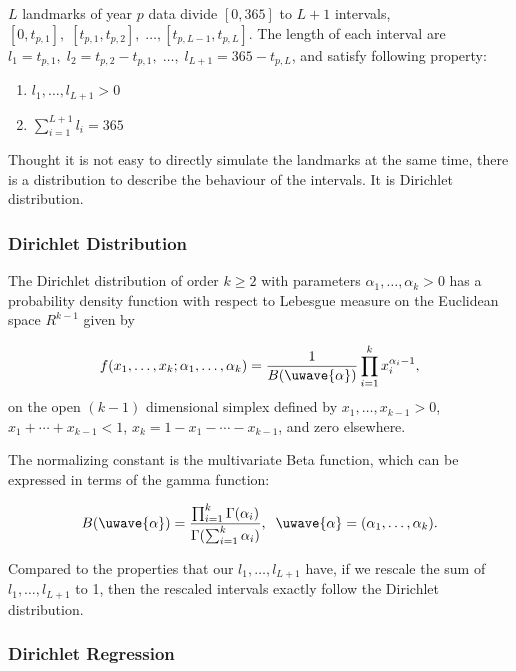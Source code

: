 \documentclass{article}
\begin{document}
$L$ landmarks of year $p$ data divide $[0,365]$ to $L+1$ intervals, $[0,t_{p,1}],\;[t_{p,1},t_{p,2}],\;\dots,[t_{p,L-1},t_{p,L}]$.
The length of each interval are $l_1 = t_{p,1},\;l_2=t_{p,2}-t_{p,1},\;\dots,\;l_{L+1}=365-t_{p,L}$, and satisfy following property:

\begin{enumerate}
\item $l_1,\dots,l_{L+1}>0$
\item $\sum_{i=1}^{L+1}l_i = 365$
\end{enumerate}

Thought it is not easy to directly simulate the landmarks at the same time, there is a distribution to describe the behaviour of the intervals. It is Dirichlet distribution.  

\subsubsection{Dirichlet Distribution}

The Dirichlet distribution of order $k\ge2$ with parameters $\alpha_1,\dots,\alpha_k>0$ has a probability density function with respect to Lebesgue measure on the Euclidean space $R^{k-1}$ given by 

\begin{equation}
f(x_1,\dots,x_k;\alpha_1,\dots,\alpha_k) = \frac{1}{B(\uwave{\alpha})}\prod_{i=1}^kx_i^{\alpha_i-1},
\end{equation}
on the open $(k-1)$ dimensional simplex defined by  $x_1,\dots,x_{k-1}>0$, $x_1+\cdots+x_{k-1}<1$,  $x_k = 1- x_1-\cdots-x_{k-1}$, and zero elsewhere.

The normalizing constant is the multivariate Beta function, which can be expressed in terms of the gamma function:

\begin{equation}
B(\uwave{\alpha}) = \frac{\prod_{i=1}^k\Gamma(\alpha_i)}{\Gamma(\sum_{i=1}^k\alpha_i)},\;\;\uwave{\alpha}=(\alpha_1,\dots,\alpha_k).
\end{equation}

Compared to the properties that our $l_1,\dots,l_{L+1}$ have, if we rescale the sum of $l_1,\dots,l_{L+1}$ to 1, then the rescaled intervals exactly follow the Dirichlet distribution.

\subsubsection{Dirichlet Regression}
\end{document}
